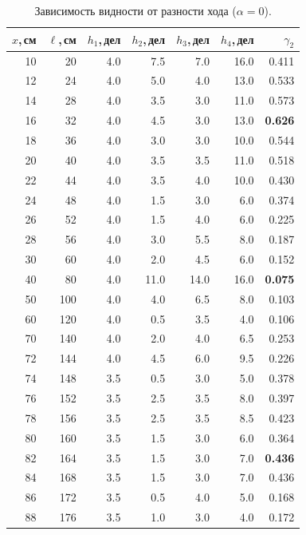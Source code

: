 \documentclass[twoside]{mfitjournal}
\begin{document}
\begin{table}[H]
\centering
\caption{Зависимость видности от разности хода ($\alpha = 0$).}
\label{tab:pos}
\footnotesize
\setlength{\tabcolsep}{5pt}
\begin{tabular}{r r r r r r r}
\toprule
$x$,\,см & $\ell$,\,см & $h_1$,\,дел & $h_2$,\,дел & $h_3$,\,дел & $h_4$,\,дел & $\gamma_2$ \\
\midrule
 10 &  20 & 4.0 & 7.5 &  7.0 & 16.0 & 0.411 \\
 12 &  24 & 4.0 & 5.0 &  4.0 & 13.0 & 0.533 \\
 14 &  28 & 4.0 & 3.5 &  3.0 & 11.0 & 0.573 \\
 16 &  32 & 4.0 & 4.5 &  3.0 & 13.0 & \textbf{0.626} \\
 18 &  36 & 4.0 & 3.0 &  3.0 & 10.0 & 0.544 \\
 20 &  40 & 4.0 & 3.5 &  3.5 & 11.0 & 0.518 \\
 22 &  44 & 4.0 & 3.5 &  4.0 & 10.0 & 0.430 \\
 24 &  48 & 4.0 & 1.5 &  3.0 &  6.0 & 0.374 \\
 26 &  52 & 4.0 & 1.5 &  4.0 &  6.0 & 0.225 \\
 28 &  56 & 4.0 & 3.0 &  5.5 &  8.0 & 0.187 \\
 30 &  60 & 4.0 & 2.0 &  4.5 &  6.0 & 0.152 \\
 40 &  80 & 4.0 & 11.0 & 14.0 & 16.0 & \textbf{0.075} \\
 50 & 100 & 4.0 & 4.0 &  6.5 &  8.0 & 0.103 \\
 60 & 120 & 4.0 & 0.5 &  3.5 &  4.0 & 0.106 \\
 70 & 140 & 4.0 & 2.0 &  4.0 &  6.5 & 0.253 \\
 72 & 144 & 4.0 & 4.5 &  6.0 &  9.5 & 0.226 \\
 74 & 148 & 3.5 & 0.5 &  3.0 &  5.0 & 0.378 \\
 76 & 152 & 3.5 & 2.5 &  3.5 &  8.0 & 0.397 \\
 78 & 156 & 3.5 & 2.5 &  3.5 &  8.5 & 0.423 \\
 80 & 160 & 3.5 & 1.5 &  3.0 &  6.0 & 0.364 \\
 82 & 164 & 3.5 & 1.5 &  3.0 &  7.0 & \textbf{0.436} \\
 84 & 168 & 3.5 & 1.5 &  3.0 &  7.0 & 0.436 \\
 86 & 172 & 3.5 & 0.5 &  4.0 &  5.0 & 0.168 \\
 88 & 176 & 3.5 & 1.0 &  3.0 &  4.0 & 0.172 \\
\bottomrule
\end{tabular}
\end{table}
\end{document}
